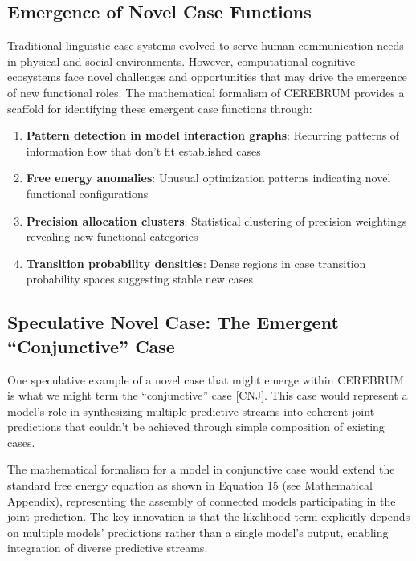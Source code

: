 \hypertarget{emergence-of-novel-case-functions}{%
\subsection{Emergence of Novel Case
Functions}\label{emergence-of-novel-case-functions}}

Traditional linguistic case systems evolved to serve human communication
needs in physical and social environments. However, computational
cognitive ecosystems face novel challenges and opportunities that may
drive the emergence of new functional roles. The mathematical formalism
of CEREBRUM provides a scaffold for identifying these emergent case
functions through:

\begin{enumerate}
\def\labelenumi{\arabic{enumi}.}
\tightlist
\item
  \textbf{Pattern detection in model interaction graphs}: Recurring
  patterns of information flow that don't fit established cases
\item
  \textbf{Free energy anomalies}: Unusual optimization patterns
  indicating novel functional configurations
\item
  \textbf{Precision allocation clusters}: Statistical clustering of
  precision weightings revealing new functional categories
\item
  \textbf{Transition probability densities}: Dense regions in case
  transition probability spaces suggesting stable new cases
\end{enumerate}

\hypertarget{speculative-novel-case-the-emergent-conjunctive-case}{%
\subsection{Speculative Novel Case: The Emergent ``Conjunctive''
Case}\label{speculative-novel-case-the-emergent-conjunctive-case}}

One speculative example of a novel case that might emerge within
CEREBRUM is what we might term the ``conjunctive'' case {[}CNJ{]}. This
case would represent a model's role in synthesizing multiple predictive
streams into coherent joint predictions that couldn't be achieved
through simple composition of existing cases.

The mathematical formalism for a model in conjunctive case would extend
the standard free energy equation as shown in Equation 15 (see
Mathematical Appendix), representing the assembly of connected models
participating in the joint prediction. The key innovation is that the
likelihood term explicitly depends on multiple models' predictions
rather than a single model's output, enabling integration of diverse
predictive streams.

